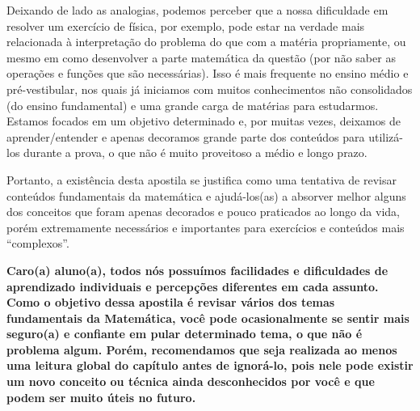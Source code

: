 Deixando de lado as analogias, podemos perceber que a nossa dificuldade em resolver um exercício de física, por exemplo, pode estar na verdade mais relacionada à interpretação do problema do que com a matéria propriamente, ou mesmo em como desenvolver a parte matemática da questão (por não saber as operações e funções que são necessárias). Isso é mais frequente no ensino médio e pré-vestibular, nos quais já iniciamos com muitos conhecimentos não consolidados (do ensino fundamental) e uma grande carga de matérias para estudarmos. Estamos focados em um objetivo determinado e, por muitas vezes, deixamos de aprender/entender e apenas decoramos grande parte dos conteúdos para utilizá-los durante a prova, o que não é muito proveitoso a médio e longo prazo.

Portanto, a existência desta apostila se justifica como uma tentativa de revisar conteúdos fundamentais da matemática e ajudá-los(as) a absorver melhor alguns dos conceitos que foram apenas decorados e pouco praticados ao longo da vida, porém extremamente necessários e importantes para exercícios e conteúdos mais ``complexos''. 

\vspace{8cm}

\textbf{Caro(a) aluno(a), todos nós possuímos facilidades e dificuldades de aprendizado individuais e percepções diferentes em cada assunto. Como o objetivo dessa apostila é revisar vários dos temas fundamentais da Matemática, você pode ocasionalmente se sentir mais seguro(a) e confiante em pular determinado tema, o que não é problema algum. Porém, recomendamos que seja realizada ao menos uma leitura global do capítulo antes de ignorá-lo, pois nele pode existir um novo conceito ou técnica ainda desconhecidos por você e que podem ser muito úteis no futuro.}

\cleardoublepage   %